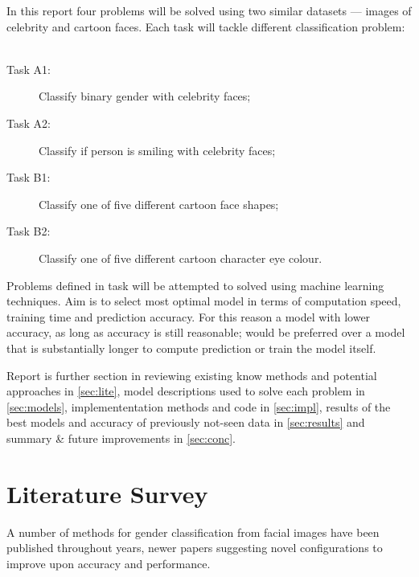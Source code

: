 \documentclass{article}
\begin{document}
In this report four problems will be solved using two similar datasets — images of celebrity and cartoon faces. Each task will tackle different classification problem:
\\\\
\begin{description}
	\item[Task A1:] Classify binary gender with celebrity faces;
	\item[Task A2:] Classify if person is smiling with celebrity faces;
	\item[Task B1:] Classify one of five different cartoon face shapes;
	\item[Task B2:] Classify one of five different cartoon character eye colour.
\end{description}
Problems defined in task will be attempted to solved using machine learning techniques. Aim is to select most optimal model in terms of computation speed, training time and prediction accuracy. For this reason a model with lower accuracy, as long as accuracy is still reasonable; would be preferred over a model that is substantially longer to compute prediction or train the model itself.

Report is further section in reviewing existing know methods and potential approaches in \autoref{sec:lite}, model descriptions used to solve each problem in \autoref{sec:models}, implemententation methods and code in \autoref{sec:impl}, results of the best models and accuracy of previously not-seen data in \autoref{sec:results} and summary \& future improvements in \autoref{sec:conc}.   
\section{Literature Survey}
\label{sec:lite}

A number of methods for gender classification from facial images have been published throughout years, newer papers suggesting novel configurations to improve upon accuracy and performance. 
\end{document}
